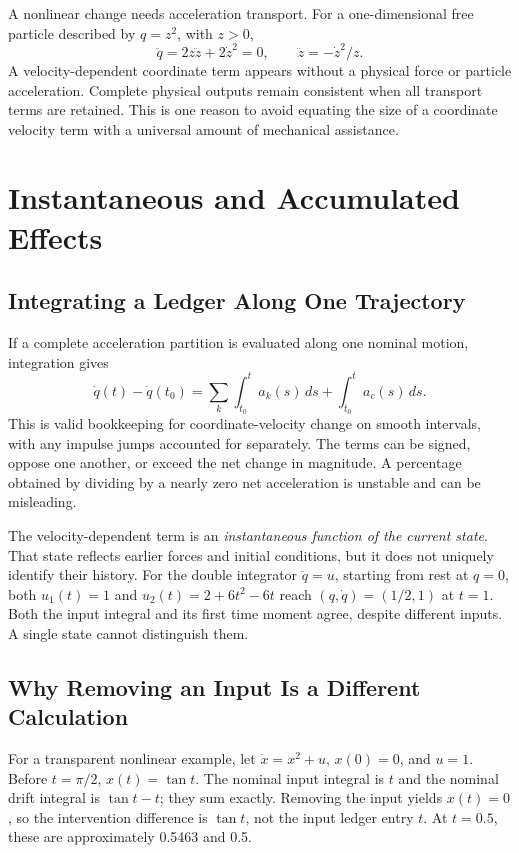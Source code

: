 A nonlinear change needs acceleration transport. For a one-dimensional free particle described by \(q=z^2\), with \(z>0\),
\[
 \ddot q=2z\ddot z+2\dot z^2=0,
 \qquad \ddot z=-\dot z^2/z.
\]
A velocity-dependent coordinate term appears without a physical force or particle acceleration. Complete physical outputs remain consistent when all transport terms are retained. This is one reason to avoid equating the size of a coordinate velocity term with a universal amount of mechanical assistance.

\section{Instantaneous and Accumulated Effects}
\label{sec:instantaneous_cumulative}

\subsection{Integrating a Ledger Along One Trajectory}
If a complete acceleration partition is evaluated along one nominal motion, integration gives
\[
 \dot q(t)-\dot q(t_0)=\sum_k\int_{t_0}^{t}a_k(s)\,ds
                         +\int_{t_0}^{t}a_c(s)\,ds.
\]
This is valid bookkeeping for coordinate-velocity change on smooth intervals, with any impulse jumps accounted for separately. The terms can be signed, oppose one another, or exceed the net change in magnitude. A percentage obtained by dividing by a nearly zero net acceleration is unstable and can be misleading.

The velocity-dependent term is an \emph{instantaneous function of the current state}. That state reflects earlier forces and initial conditions, but it does not uniquely identify their history. For the double integrator \(\ddot q=u\), starting from rest at \(q=0\), both \(u_1(t)=1\) and \(u_2(t)=2+6t^2-6t\) reach \((q,\dot q)=(1/2,1)\) at \(t=1\). Both the input integral and its first time moment agree, despite different inputs. A single state cannot distinguish them.

\subsection{Why Removing an Input Is a Different Calculation}
For a transparent nonlinear example, let \(\dot x=x^2+u\), \(x(0)=0\), and \(u=1\). Before \(t=\pi/2\), \(x(t)=\tan t\). The nominal input integral is \(t\) and the nominal drift integral is \(\tan t-t\); they sum exactly. Removing the input yields \(x(t)=0\), so the intervention difference is \(\tan t\), not the input ledger entry \(t\). At \(t=0.5\), these are approximately 0.5463 and 0.5.

